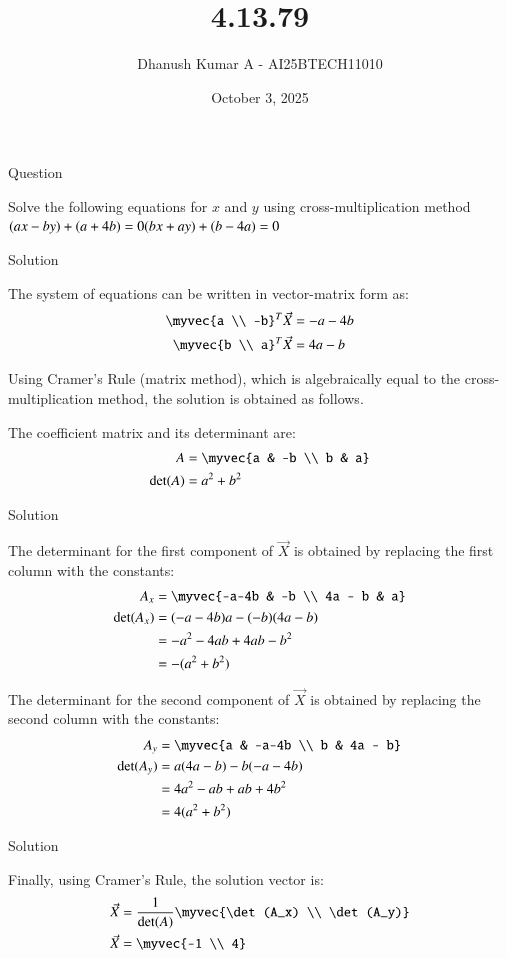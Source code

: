 \documentclass{beamer}
\title 
{4.13.79}
\date{October 3, 2025}
\author 
{Dhanush Kumar A - AI25BTECH11010}
\begin{document}
\frame{\titlepage}
\begin{frame}{Question}

Solve the following equations for $x$ and $y$ using cross-multiplication method\\
$
(ax - by) + (a + 4b) = 0 \\
(bx + ay) + (b - 4a) = 0
$\\

\end{frame}
\begin{frame}{Solution}

The system of equations can be written in vector-matrix form as:
\begin{align}
\myvec{a \\ -b}^T\vec{X} &= -a - 4b \\
\myvec{b \\ a}^T\vec{X} &= 4a - b
\end{align}

Using Cramer's Rule (matrix method), which is algebraically equal to the cross-multiplication method, the solution is obtained as follows.

The coefficient matrix and its determinant are:
\begin{align}
A &= \myvec{a & -b \\ b & a} \\
\det(A) &= a^2 + b^2
\end{align}
\end{frame}
\begin{frame}{Solution}

The determinant for the first component of $\vec{X}$ is obtained by replacing the first column with the constants:
\begin{align}
A_x &= \myvec{-a-4b & -b \\ 4a - b & a} \\
\det(A_x) &= (-a-4b)a - (-b)(4a-b) \\
&= -a^2 - 4ab + 4ab - b^2 \\
&= -(a^2 + b^2)
\end{align}

The determinant for the second component of $\vec{X}$ is obtained by replacing the second column with the constants:
\begin{align}
A_y &= \myvec{a & -a-4b \\ b & 4a - b} \\
\det(A_y) &= a(4a-b) - b(-a-4b) \\
&= 4a^2 - ab + ab + 4b^2 \\
&= 4(a^2 + b^2)
\end{align}
\end{frame}
\begin{frame}{Solution}

Finally, using Cramer's Rule, the solution vector is:
\begin{align}
\vec{X} &= \frac{1}{\det(A)} \myvec{\det(A_x) \\ \det(A_y)} \\
\vec{X} &= \myvec{-1 \\ 4}
\end{align}

\end{frame}
\end{document}
